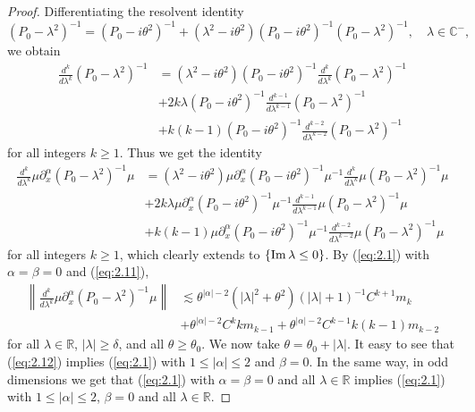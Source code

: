 \documentclass[11pt]{amsart}
\numberwithin{equation}{section}
\def\R{{\mathbb R}}
\begin{document}
\begin{proof}
Differentiating the resolvent identity
 \begin{equation*}
 (P_0-\lambda^2)^{-1}=(P_0-i\theta^2)^{-1}+(\lambda^2-i\theta^2)(P_0-i\theta^2)^{-1}(P_0-\lambda^2)^{-1},\quad \lambda\in\mathbb{C}^-,
 \end{equation*}
 we obtain
 \begin{equation*}
 \begin{split}
 \frac{d^k}{d\lambda^k}(P_0-\lambda^2)^{-1}&=(\lambda^2-i\theta^2)(P_0-i\theta^2)^{-1}\frac{d^k}{d\lambda^k}(P_0-\lambda^2)^{-1}\\
 &+2k\lambda(P_0-i\theta^2)^{-1}\frac{d^{k-1}}{d\lambda^{k-1}}(P_0-\lambda^2)^{-1}\\
 &+k(k-1)(P_0-i\theta^2)^{-1}\frac{d^{k-2}}{d\lambda^{k-2}}(P_0-\lambda^2)^{-1}
  \end{split}
 \end{equation*}
 for all integers $k\ge 1$. Thus we get the identity
 \begin{equation*}
 \begin{split}
 \frac{d^k}{d\lambda^k}\mu\partial_x^\alpha(P_0-\lambda^2)^{-1}\mu&=(\lambda^2-i\theta^2)\mu\partial_x^\alpha(P_0-i\theta^2)^{-1}\mu^{-1}
 \frac{d^k}{d\lambda^k}\mu(P_0-\lambda^2)^{-1}\mu\\
 &+2k\lambda\mu\partial_x^\alpha(P_0-i\theta^2)^{-1}\mu^{-1}\frac{d^{k-1}}{d\lambda^{k-1}}\mu(P_0-\lambda^2)^{-1}\mu\\
 &+k(k-1)\mu\partial_x^\alpha(P_0-i\theta^2)^{-1}\mu^{-1}\frac{d^{k-2}}{d\lambda^{k-2}}\mu(P_0-\lambda^2)^{-1}\mu
  \end{split}
 \end{equation*}
 for all integers $k\ge 1$, which clearly extends to $\{{\rm Im}\,\lambda\le 0\}$. By (\ref{eq:2.1}) with $\alpha=\beta=0$
 and (\ref{eq:2.11}),
 \begin{equation}\label{eq:2.12}
 \begin{split}
 \left\|\frac{d^k}{d\lambda^k}\mu\partial_x^\alpha
 (P_0-\lambda^2)^{-1}\mu\right\|&\lesssim\theta^{|\alpha|-2}(|\lambda|^2+\theta^2)(|\lambda|+1)^{-1}C^{k+1}m_k\\
 &+\theta^{|\alpha|-2}C^{k}km_{k-1}+\theta^{|\alpha|-2}C^{k-1}k(k-1)m_{k-2}
  \end{split}
 \end{equation}
 for all $\lambda\in\R$, $|\lambda|\ge\delta$, and all $\theta\ge\theta_0$. We now take $\theta=\theta_0+|\lambda|$.
 It easy to see that (\ref{eq:2.12}) implies (\ref{eq:2.1}) with 
 $1\le |\alpha|\le 2$ and $\beta=0$. 
 In the same way, in odd dimensions we get that (\ref{eq:2.1}) with $\alpha=\beta=0$ and all $\lambda\in\R$ implies (\ref{eq:2.1}) with 
 $1\le |\alpha|\le 2$, $\beta=0$ 
 and all $\lambda\in\R$. 
 

\end{proof}
\end{document}
